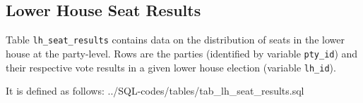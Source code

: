 \subsection{Lower House Seat Results}\label{subsec_tab_lh_seat_results}
Table \texttt{lh\_seat\_results} contains data on the distribution of seats in the lower house at the party-level. 
Rows are the parties (identified by variable \texttt{pty\_id}) and their respective vote results in a given lower house election (variable \texttt{lh\_id}).


It is defined as follows: 
%
{../SQL-codes/tables/tab_lh_seat_results.sql}

